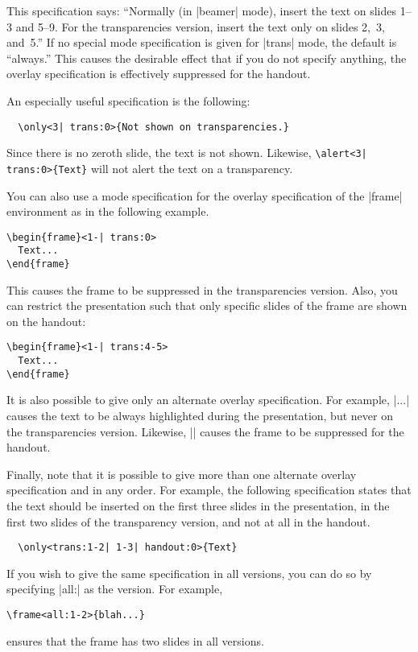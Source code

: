 This specification says: ``Normally (in |beamer| mode), insert the text on slides 1--3 and 5--9. For the transparencies version, insert the text only on slides 2,~3, and~5.'' If no special mode specification is given for |trans| mode, the default is ``always.'' This causes the desirable effect that if you do not specify anything, the overlay specification is effectively suppressed for the handout.

An especially useful specification is the following:
\begin{verbatim}
  \only<3| trans:0>{Not shown on transparencies.}
\end{verbatim}

Since there is no zeroth slide, the text is not shown. Likewise, \verb!\alert<3| trans:0>{Text}! will not alert the text on a transparency.

You can also use a mode specification for the overlay specification of the |{frame}| environment as in the following example.
\begin{verbatim}
\begin{frame}<1-| trans:0>
  Text...
\end{frame}
\end{verbatim}

This causes the frame to be suppressed in the transparencies version. Also, you can restrict the presentation such that only specific slides of the frame are shown on the handout:
\begin{verbatim}
\begin{frame}<1-| trans:4-5>
  Text...
\end{frame}
\end{verbatim}

It is also possible to give only an alternate overlay specification. For example, |\alert<trans:0>{...}| causes the text to be always highlighted during the presentation, but never on the transparencies version. Likewise, || causes the frame to be suppressed for the handout.

Finally, note that it is possible to give more than one alternate overlay specification and in any order. For example, the following specification states that the text should be inserted on the first three slides in the presentation, in the first two slides of the transparency version, and not at all in the handout.
\begin{verbatim}
  \only<trans:1-2| 1-3| handout:0>{Text}
\end{verbatim}

If you wish to give the same specification in all versions, you can do so by specifying |all:| as the version. For example,
\begin{verbatim}
\frame<all:1-2>{blah...}
\end{verbatim}

ensures that the frame has two slides in all versions.
